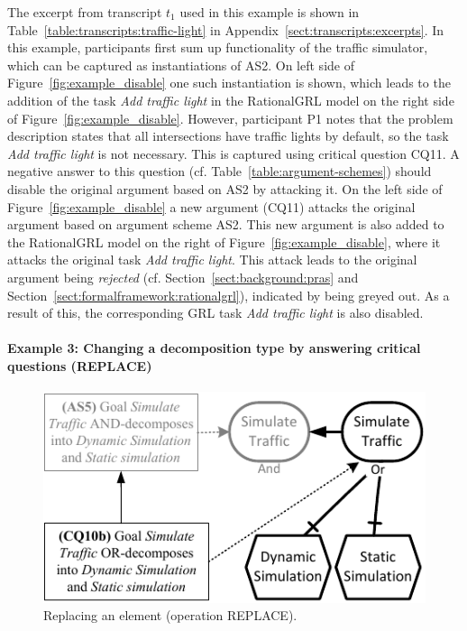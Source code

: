 The excerpt from transcript $t_1$ used in this example is shown in Table~\ref{table:transcripts:traffic-light} in Appendix~\ref{sect:transcripts:excerpts}. In this example, participants first sum up functionality of the traffic simulator, which can be captured as instantiations of AS2. On left side of Figure~\ref{fig:example_disable} one such instantiation is shown, which leads to the addition of the task \emph{Add traffic light} in the RationalGRL model on the right side of Figure~\ref{fig:example_disable}. However, participant P1 notes that the problem description states that all intersections have traffic lights by default, so the task \emph{Add traffic light} is not necessary. This is captured using critical question CQ11. A negative answer to this question (cf. Table~\ref{table:argument-schemes}) should disable the original argument based on AS2 by attacking it. On the left side of Figure~\ref{fig:example_disable} a new argument (CQ11) attacks the original argument based on argument scheme AS2. This new argument is also added to the RationalGRL model on the right of Figure~\ref{fig:example_disable}, where it attacks the original task \emph{Add traffic light}. This attack leads to the original argument being \emph{rejected} (cf. Section~\ref{sect:background:pras} and Section~\ref{sect:formalframework:rationalgrl}), indicated by being greyed out. As a result of this, the corresponding GRL task \emph{Add traffic light} is also disabled. 

\paragraph{Example 3: Changing a decomposition type by answering critical questions (\textsf{REPLACE})} 

\begin{figure}[t]
\centering
\includegraphics[]{img/fig_example_replace.pdf}
\caption{Replacing an element (operation \textsf{REPLACE)}.}
\label{fig:examples:replace}
\end{figure}

